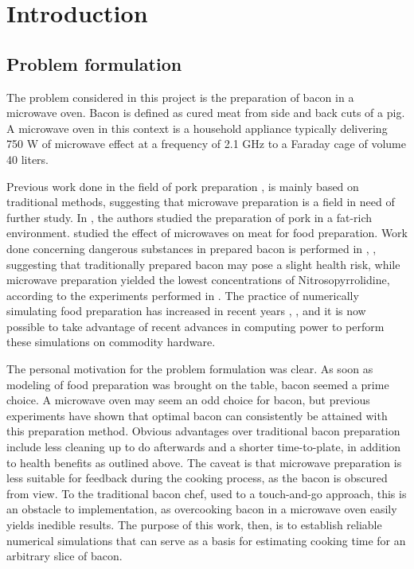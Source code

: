 \chapter{Introduction}
\setcounter{secnumdepth}{1}

\section{Problem formulation}
The problem considered in this project is the preparation of bacon in a microwave oven. Bacon is
defined as cured meat from side and back cuts of a pig. A microwave oven in this context is a
household appliance typically delivering 750 W of microwave effect at a frequency of 2.1 GHz
to a Faraday cage of volume 40 liters. 

Previous work done in the field of pork preparation
\cite{pork-cooking-diffusion}, \cite{pork-chops} is mainly based on
traditional methods, suggesting that microwave preparation is
a field in need of further study. In \cite{deepfrying}, the authors studied the preparation of
pork in a fat-rich environment. \cite{nykvist} studied the effect of microwaves on meat for
food preparation. Work done concerning dangerous substances in
prepared bacon is performed in \cite{bacon-safety-original}, \cite{bacon-safety-micro}, suggesting that traditionally prepared
bacon may pose a slight health risk, while microwave preparation yielded the
lowest concentrations of Nitrosopyrrolidine, according to the experiments
performed in \cite{bacon-safety-micro}.
The practice of numerically simulating food preparation has increased in recent
years \cite{meat-cooking-numerical}, \cite{chicken-numerics}, and it is now
possible to take advantage of recent advances in computing power to perform these 
simulations on commodity hardware.

The personal motivation for the problem formulation was clear. As soon as modeling of food preparation was
brought on the table, bacon seemed a prime choice. A microwave oven may seem an odd choice for
bacon, but previous experiments have shown that optimal bacon can consistently be attained with this
preparation method. Obvious advantages over traditional bacon preparation include less cleaning up
to do afterwards and a shorter time-to-plate, in addition to health benefits as
outlined above. The caveat is that microwave preparation is less
suitable for feedback during the cooking process, as the bacon is obscured from view. To the
traditional bacon chef, used to a touch-and-go approach, this is an obstacle to implementation, as
overcooking bacon in a microwave oven easily yields inedible results. The
purpose of this work, then, is to establish reliable numerical simulations that can serve as a basis
for estimating cooking time for an arbitrary slice of bacon.

